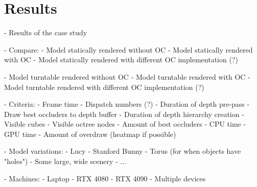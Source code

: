 \chapter{Results} \label{cpt-results}

- Results of the case study


- Compare:
    - Model statically rendered without OC
    - Model statically rendered with OC
    - Model statically rendered with different OC implementation (?)
    
    - Model turntable rendered without OC
    - Model turntable rendered with OC
    - Model turntable rendered with different OC implementation (?)


- Criteria: 
    - Frame time
    - Dispatch numbers (?)
    - Duration of depth pre-pass
        - Draw best occluders to depth buffer
        - Duration of depth hierarchy creation
    - Visible cubes
    - Visible octree nodes
    - Amount of best occluders
    - CPU time
    - GPU time
    - Amount of overdraw (heatmap if possible)


- Model variations:
    - Lucy
    - Stanford Bunny
    - Torus (for when objects have "holes")
    - Some large, wide scenery
    - ...


- Machines:
    - Laptop
    - RTX 4080
    - RTX 4090
    - Multiple devices